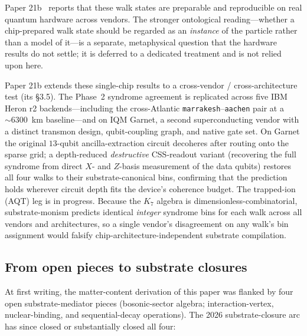 \documentclass[11pt]{article}
\begin{document}
Paper 21b~\cite{Paper21b} reports that these walk states are preparable and reproducible on real quantum hardware across vendors.  The stronger ontological reading---whether a chip-prepared walk state should be regarded as an \emph{instance} of the particle rather than a model of it---is a separate, metaphysical question that the hardware results do not settle; it is deferred to a dedicated treatment and is not relied upon here.

Paper 21b extends these single-chip results to a cross-vendor / cross-architecture test (its \S3.5).  The Phase~2 syndrome agreement is replicated across five IBM Heron r2 backends---including the cross-Atlantic \texttt{marrakesh}--\texttt{aachen} pair at a $\sim 6300$~km baseline---and on IQM Garnet, a second superconducting vendor with a distinct transmon design, qubit-coupling graph, and native gate set.  On Garnet the original $13$-qubit ancilla-extraction circuit decoheres after routing onto the sparse grid; a depth-reduced \emph{destructive} CSS-readout variant (recovering the full syndrome from direct $X$- and $Z$-basis measurement of the data qubits) restores all four walks to their substrate-canonical bins, confirming that the prediction holds wherever circuit depth fits the device's coherence budget.  The trapped-ion (AQT) leg is in progress.  Because the $K_7$ algebra is dimensionless-combinatorial, substrate-monism predicts identical \emph{integer} syndrome bins for each walk across all vendors and architectures, so a single vendor's disagreement on any walk's bin assignment would falsify chip-architecture-independent substrate compilation.

\subsection{From open pieces to substrate closures}
\label{sec:open-pieces}

At first writing, the matter-content derivation of this paper was flanked by four open substrate-mediator pieces (bosonic-sector algebra; interaction-vertex, nuclear-binding, and sequential-decay operations).  The 2026 substrate-closure arc has since closed or substantially closed all four:
\end{document}
